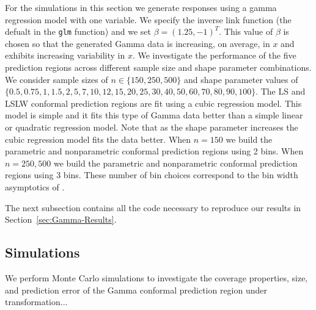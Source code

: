 \documentclass[11pt]{article}\usepackage[]{graphicx}\usepackage[]{color}
\begin{document}
For the simulations in this section we generate responses using a gamma 
regression model with one variable.  We specify the inverse link function 
(the defualt in the \texttt{glm} function) and we set 
$\beta = (1.25, -1)^T$.  This value of $\beta$ is chosen so that the generated 
Gamma data is increasing, on average, in $x$ and exhibits increasing 
variability in $x$.  We investigate the performance of the five prediction 
regions across different sample size and shape parameter combinations.  We 
consider sample sizes of $n \in \{150, 250, 500\}$ and shape parameter values 
of $\{0.5, 0.75, 1, 1.5, 2, 5, 7, 10, 12, 15, 20, 25, 30, 40, 50, 60, 70, 80, 90, 100\}$.  
The LS and LSLW conformal prediction regions are fit using a cubic regression 
model.  This model is simple and it fits this type of Gamma data better than a 
simple linear or quadratic regression model.  Note that as the shape parameter 
increases the cubic regression model fits the data better.  When $n = 150$ we 
build the parametric and nonparametric conformal prediction regions using 2 
bins.  When $n = 250, 500$ we build the parametric and nonparametric conformal 
prediction regions using 3 bins.  These number of bin choices correspond to 
the bin width asymptotics of \citet{lei2014distribution}.

The next subsection contains all the code necessary to reproduce our results 
in Section~\ref{sec:Gamma-Results}.



\subsection{Simulations}

We perform Monte Carlo simulations to investigate the coverage properties, 
size, and prediction error of the Gamma conformal prediction region under 
transformation...
\end{document}
